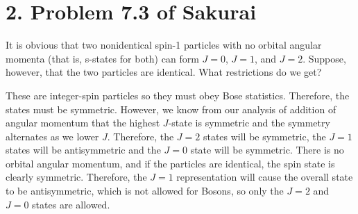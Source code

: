 \documentclass[a4paper,twoside]{article}
\begin{document}
\section*{2. Problem 7.3 of Sakurai}
It is obvious that two nonidentical spin-1 particles with no orbital angular momenta (that is, s-states for both) can form $ J = 0 $, $ J = 1 $, and $ J = 2 $. Suppose, however, that the two particles are identical. What restrictions do we get?
\begin{problem}
    These are integer-spin particles so they must obey Bose statistics. Therefore, the states must be symmetric. However, we know from our analysis of addition of angular momentum that the highest $ J $-state is symmetric and the symmetry alternates as we lower $ J $. Therefore, the $ J = 2 $ states will be symmetric, the $ J = 1 $ states will be antisymmetric and the $ J = 0 $ state will be symmetric. There is no orbital angular momentum, and if the particles are identical, the spin state is clearly symmetric. Therefore, the $ J=1 $ representation will cause the overall state to be antisymmetric, which is not allowed for Bosons, so only the $ J=2 $ and $ J=0 $ states are allowed.
\end{problem}
\end{document}
